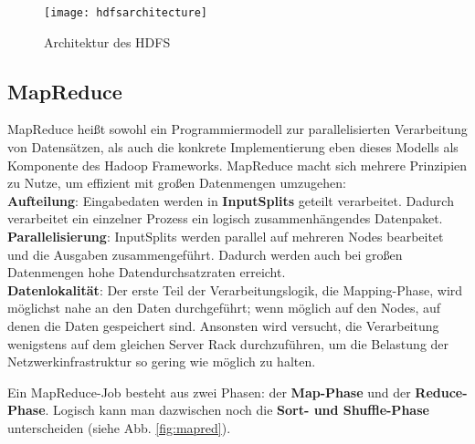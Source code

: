 \begin{figure}[ht]
    \centering
    \texttt{[image: hdfsarchitecture]}
    \caption[Architektur des HDFS]{Architektur des HDFS\parencite[S.69, Figure 3-2]{white_hadoop_2015}}
    \label{fig:hdfs}
\end{figure}

\subsection{MapReduce}
\label{chap:fund sec:core sub:mapred}
MapReduce heißt sowohl ein Programmiermodell zur parallelisierten Verarbeitung von Datensätzen, als auch die konkrete Implementierung eben dieses Modells als Komponente des Hadoop Frameworks. MapReduce macht sich mehrere Prinzipien zu Nutze, um effizient mit großen Datenmengen umzugehen\cite{freiknecht_big_2018}: \\
\textbf{Aufteilung}: Eingabedaten werden in \textbf{InputSplits} geteilt verarbeitet. Dadurch verarbeitet ein einzelner Prozess ein logisch zusammenhängendes Datenpaket.\\
\textbf{Parallelisierung}: InputSplits werden parallel auf mehreren Nodes bearbeitet und die Ausgaben zusammengeführt. Dadurch werden auch bei großen Datenmengen hohe Datendurchsatzraten erreicht.\\
\textbf{Datenlokalität}: Der erste Teil der Verarbeitungslogik, die Mapping-Phase, wird möglichst nahe an den Daten durchgeführt; wenn möglich auf den Nodes, auf denen die Daten gespeichert sind. Ansonsten wird versucht, die Verarbeitung wenigstens auf dem gleichen Server Rack durchzuführen, um die Belastung der Netzwerkinfrastruktur so gering wie möglich zu halten.
\par
Ein MapReduce-Job besteht aus zwei Phasen: der \textbf{Map-Phase} und der \textbf{Reduce-Phase}. Logisch kann man dazwischen noch die \textbf{Sort- und Shuffle-Phase} unterscheiden (siehe Abb. \ref*{fig:mapred}).

